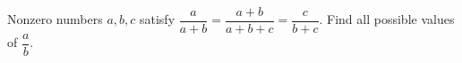 Nonzero numbers $a,b,c$ satisfy $\dfrac {a}{a+b}=\dfrac{a+b}{a+b+c}=\dfrac {c}{b+c}$. Find all possible values of $\dfrac {a}{b}$.
